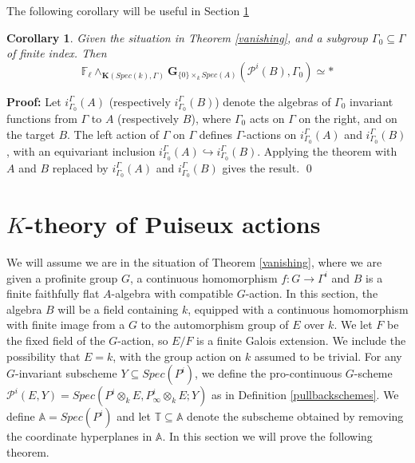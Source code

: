 \documentclass[11pt]{article}
\newcommand\mb{\mathbb}
\newcommand\mc{\mathcal}
\def \bK{\mathbf K}
\newcommand\mfk{\mathbf G}
\newtheorem{Corollary}{Corollary}[section]
\newenvironment{Proof}{\par\noindent\textbf{Proof:}}
{\qed}
\begin{document}
The following corollary will be useful in Section \ref{Bextensions}
\begin{Corollary} \label{subgroups}
Given the situation in Theorem \ref{vanishing}, and a subgroup $\Gamma _0 \subseteq \Gamma $ of finite index.  Then  
$$ {\mb{F}}_{\ell} \wedge _{\bK(Spec(k), \Gamma)}
    \mfk_{ \{ 0 \}\times _k Spec(A)}(\mc{P}^i(B) , \Gamma_0 ) \simeq  *
$$
    \end{Corollary}
    \begin{Proof}
        Let $i_{\Gamma _0}^{\Gamma}(A)$ (respectively $i_{\Gamma _0}^{\Gamma}(B)$)  denote the algebras of $\Gamma _0$ invariant functions from $\Gamma$ to $A$ (respectively $B$), where $\Gamma_0$ acts on $\Gamma $ on the right, and on the target $B$.  The left action of $\Gamma$ on $\Gamma$ defines  $\Gamma$-actions on $i_{\Gamma _0}^{\Gamma}(A)$ and $i_{\Gamma _0}^{\Gamma}(B)$, with an equivariant inclusion 
        $i_{\Gamma _0}^{\Gamma} (A) \hookrightarrow i_{\Gamma _0}^{\Gamma} (B)$.  Applying the theorem with $A$ and $B$ replaced by $i_{\Gamma _0}^{\Gamma}(A)$ and $i_{\Gamma _0}^{\Gamma}(B)$ gives the result.  
    \end{Proof}





















       
 \section{$K$-theory of Puiseux actions}\label{Bextensions} 

We will assume we are in the situation of Theorem \ref{vanishing}, where we are given a profinite group $G$, a continuous homomorphism $f: G \rightarrow \Gamma^i$ and $B$ is a finite faithfully flat $A$-algebra with compatible $G$-action.   In this section, the algebra $B$ will be a field containing $k$, equipped with a continuous homomorphism  with finite image from a $G$ to the automorphism group of $E$ over $k$. We let $F$ be the fixed field of the $G$-action, so $E/F$ is a finite Galois extension. We include the possibility that $E = k$, with the group action on $k$ assumed to be trivial.  For any $G$-invariant subscheme $Y \subseteq Spec(P^i)$, we define the pro-continuous $G$-scheme $\mc{P}^i(E, Y) = Spec(P^i \otimes_k E, P^i _{\infty} \otimes _k E; Y) $ as in Definition \ref{pullbackschemes}. We  define $\mb{A} = Spec(P^i)$ and let  $\mb{T} \subseteq \mb{A} $ denote the subscheme obtained by removing the coordinate hyperplanes in $\mb{A}$. In this section we will prove the following theorem. 
\end{document}
